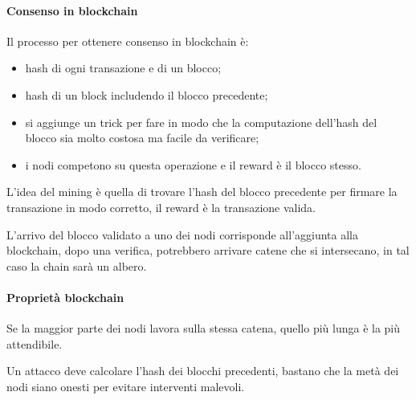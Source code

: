 \paragraph{Consenso in blockchain}
Il processo per ottenere consenso in blockchain è:
\begin{itemize}
    \item hash di ogni transazione e di un blocco;
    \item hash di un block includendo il blocco precedente;
    \item si aggiunge un trick per fare in modo che la computazione 
    dell'hash del blocco sia molto costosa ma facile da verificare;
    \item i nodi competono su questa operazione e il reward è 
    il blocco stesso.
\end{itemize} 
L'idea del mining è quella di trovare l'hash del blocco precedente 
per firmare la transazione in modo corretto, il reward è la transazione valida.

L'arrivo del blocco validato a uno dei nodi corrisponde all'aggiunta 
alla blockchain, dopo una verifica, potrebbero arrivare catene che si intersecano, 
in tal caso la chain sarà un albero.

\paragraph{Proprietà blockchain}
Se la maggior parte dei nodi lavora sulla stessa catena, quello più lunga è la più
attendibile. 

Un attacco deve calcolare l'hash dei blocchi precedenti, bastano che la metà
dei nodi siano onesti per evitare interventi malevoli.

